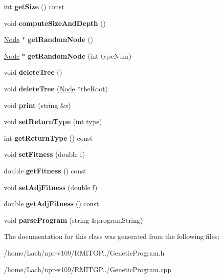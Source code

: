 \begin{DoxyCompactItemize}
int {\bfseries get\+Size} () const
\item 
\hypertarget{classGeneticProgram_a7fcbcb1c72fb1123558d8c3458aa9630}{}\label{classGeneticProgram_a7fcbcb1c72fb1123558d8c3458aa9630} 
void {\bfseries compute\+Size\+And\+Depth} ()
\item 
\hypertarget{classGeneticProgram_a26d07af8f37418992cb031f748a6cd8e}{}\label{classGeneticProgram_a26d07af8f37418992cb031f748a6cd8e} 
\hyperlink{classNode}{Node} $\ast$ {\bfseries get\+Random\+Node} ()
\item 
\hypertarget{classGeneticProgram_a81c41b96e2d57f906558dfa7f8a557d9}{}\label{classGeneticProgram_a81c41b96e2d57f906558dfa7f8a557d9} 
\hyperlink{classNode}{Node} $\ast$ {\bfseries get\+Random\+Node} (int type\+Num)
\item 
\hypertarget{classGeneticProgram_a1532f6a6b458495c5dd399c74ea838e7}{}\label{classGeneticProgram_a1532f6a6b458495c5dd399c74ea838e7} 
void {\bfseries delete\+Tree} ()
\item 
\hypertarget{classGeneticProgram_ab11a81758b70a1a383598b3523712fe1}{}\label{classGeneticProgram_ab11a81758b70a1a383598b3523712fe1} 
void {\bfseries delete\+Tree} (\hyperlink{classNode}{Node} $\ast$the\+Root)
\item 
\hypertarget{classGeneticProgram_a18ac2cdc76a52cd7854af44008e0ba07}{}\label{classGeneticProgram_a18ac2cdc76a52cd7854af44008e0ba07} 
void {\bfseries print} (string \&s)
\item 
\hypertarget{classGeneticProgram_ac9e88c0250e07288e520c7e6b35b3d49}{}\label{classGeneticProgram_ac9e88c0250e07288e520c7e6b35b3d49} 
void {\bfseries set\+Return\+Type} (int type)
\item 
\hypertarget{classGeneticProgram_a962fb648e94aae61294e441da1674393}{}\label{classGeneticProgram_a962fb648e94aae61294e441da1674393} 
int {\bfseries get\+Return\+Type} () const
\item 
\hypertarget{classGeneticProgram_af8e4e08bf8c0eb2d1411bc91c1243b97}{}\label{classGeneticProgram_af8e4e08bf8c0eb2d1411bc91c1243b97} 
void {\bfseries set\+Fitness} (double f)
\item 
\hypertarget{classGeneticProgram_ab1c33e4a36a003d1154f1fae1c8899c6}{}\label{classGeneticProgram_ab1c33e4a36a003d1154f1fae1c8899c6} 
double {\bfseries get\+Fitness} () const
\item 
\hypertarget{classGeneticProgram_a7a6e3c1282b12e0da39331dc44c558ef}{}\label{classGeneticProgram_a7a6e3c1282b12e0da39331dc44c558ef} 
void {\bfseries set\+Adj\+Fitness} (double f)
\item 
\hypertarget{classGeneticProgram_a4051ef3b612dd063bb6287f787fb78fe}{}\label{classGeneticProgram_a4051ef3b612dd063bb6287f787fb78fe} 
double {\bfseries get\+Adj\+Fitness} () const
\item 
\hypertarget{classGeneticProgram_a1e482c80cf346bde1a5833614af3cd82}{}\label{classGeneticProgram_a1e482c80cf346bde1a5833614af3cd82} 
void {\bfseries parse\+Program} (string \&program\+String)
\end{DoxyCompactItemize}


The documentation for this class was generated from the following files\+:\begin{DoxyCompactItemize}
\item 
/home/\+Lach/npr-\/v109/\+R\+M\+I\+T\+G\+P../Genetic\+Program.\+h\item 
/home/\+Lach/npr-\/v109/\+R\+M\+I\+T\+G\+P../Genetic\+Program.\+cpp\end{DoxyCompactItemize}
